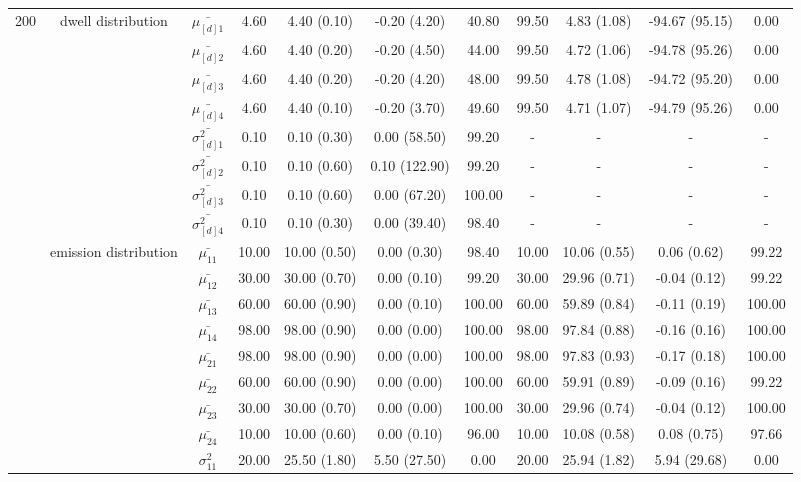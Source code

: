 \begin{table}[h]
{\begin{tabular}{ccccccccccc}
200 & dwell distribution & $\bar{\mu_{[d]1}}$ & 4.60 & 4.40 (0.10) & -0.20 (4.20) & 40.80 & 99.50 & 4.83 (1.08) & -94.67 (95.15) & 0.00 \\
\multirow{39}{*}{} & \multirow{7}{*}{} & $\bar{\mu_{[d]2}}$ & 4.60 & 4.40 (0.20) & -0.20 (4.50) & 44.00 & 99.50 & 4.72 (1.06) & -94.78 (95.26) & 0.00 \\
 &  & $\bar{\mu_{[d]3}}$ & 4.60 & 4.40 (0.20) & -0.20 (4.20) & 48.00 & 99.50 & 4.78 (1.08) & -94.72 (95.20) & 0.00 \\
 &  & $\bar{\mu_{[d]4}}$ & 4.60 & 4.40 (0.10) & -0.20 (3.70) & 49.60 & 99.50 & 4.71 (1.07) & -94.79 (95.26) & 0.00 \\
 &  & $\bar{\sigma^2_{[d]1}}$ & 0.10 & 0.10 (0.30) & 0.00 (58.50) & 99.20 & - & - & - & - \\
 &  & $\bar{\sigma^2_{[d]2}}$ & 0.10 & 0.10 (0.60) & 0.10 (122.90) & 99.20 & - & - & - & - \\
 &  & $\bar{\sigma^2_{[d]3}}$ & 0.10 & 0.10 (0.60) & 0.00 (67.20) & 100.00 & - & - & - & - \\
 &  & $\bar{\sigma^2_{[d]4}}$ & 0.10 & 0.10 (0.30) & 0.00 (39.40) & 98.40 & - & - & - & - \\
 & emission distribution & $\bar{\mu_{11}}$ & 10.00 & 10.00 (0.50) & 0.00 (0.30) & 98.40 & 10.00 & 10.06 (0.55) & 0.06 (0.62) & 99.22 \\
 & \multirow{15}{*}{} & $\bar{\mu_{12}}$ & 30.00 & 30.00 (0.70) & 0.00 (0.10) & 99.20 & 30.00 & 29.96 (0.71) & -0.04 (0.12) & 99.22 \\
 &  & $\bar{\mu_{13}}$ & 60.00 & 60.00 (0.90) & 0.00 (0.10) & 100.00 & 60.00 & 59.89 (0.84) & -0.11 (0.19) & 100.00 \\
 &  & $\bar{\mu_{14}}$ & 98.00 & 98.00 (0.90) & 0.00 (0.00) & 100.00 & 98.00 & 97.84 (0.88) & -0.16 (0.16) & 100.00 \\
 &  & $\bar{\mu_{21}}$ & 98.00 & 98.00 (0.90) & 0.00 (0.00) & 100.00 & 98.00 & 97.83 (0.93) & -0.17 (0.18) & 100.00 \\
 &  & $\bar{\mu_{22}}$ & 60.00 & 60.00 (0.90) & 0.00 (0.00) & 100.00 & 60.00 & 59.91 (0.89) & -0.09 (0.16) & 99.22 \\
 &  & $\bar{\mu_{23}}$ & 30.00 & 30.00 (0.70) & 0.00 (0.00) & 100.00 & 30.00 & 29.96 (0.74) & -0.04 (0.12) & 100.00 \\
 &  & $\bar{\mu_{24}}$ & 10.00 & 10.00 (0.60) & 0.00 (0.10) & 96.00 & 10.00 & 10.08 (0.58) & 0.08 (0.75) & 97.66 \\
 &  & $\sigma^2_{11}$ & 20.00 & 25.50 (1.80) & 5.50 (27.50) & 0.00 & 20.00 & 25.94 (1.82) & 5.94 (29.68) & 0.00 \\

\end{tabular}}
\end{table}
